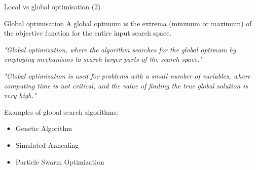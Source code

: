 \documentclass[10pt,aspectratio=169,notes]{beamer} %
\begin{document}
\begin{frame}{Local vs global optimisation (2)}
\begin{alertblock}{Global optimisation}
	A global optimum is the extrema (minimum or maximum) of the objective function for the entire input search space.
\end{alertblock}
\emph{"Global optimization, where the algorithm searches for the global optimum by employing mechanisms to search larger parts of the search space."}
\begin{biblio}{}
\end{biblio}

\emph{"Global optimization is used for problems with a small number of variables, where computing time is not critical, and the value of finding the true global solution is very high."}
\begin{biblio}{}
\end{biblio}
	
Examples of global search algorithms:
	\begin{itemize}
		\item Genetic Algorithm
		\item Simulated Annealing
		\item Particle Swarm Optimization
	\end{itemize}		
\end{frame}
\end{document}
